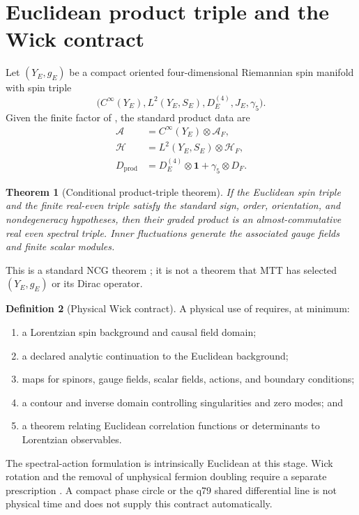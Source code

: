 \documentclass[11pt,a4paper,twoside]{article}
\theoremstyle{plain}
\newtheorem{theorem}{Theorem}[section]
\theoremstyle{definition}
\newtheorem{definition}[theorem]{Definition}
\theoremstyle{remark}
\newcommand{\AF}{\mathcal{A}_{F}}
\newcommand{\HF}{\mathcal{H}_{F}}
\newcommand{\DF}{D_{F}}
\newcommand{\id}{\mathbf{1}}
\begin{document}
\section{Euclidean product triple and the Wick contract}

Let $(Y_E,g_E)$ be a compact oriented four-dimensional Riemannian spin
manifold with spin triple
\[
 \bigl(C^\infty(Y_E),L^2(Y_E,S_E),D_E^{(4)},J_E,\gamma_5\bigr).
\]
Given the finite factor of , the standard product data are
\[
\begin{aligned}
 \mathcal{A}&=C^\infty(Y_E)\otimes\AF,\\
 \mathcal{H}&=L^2(Y_E,S_E)\otimes\HF,\\
 D_{\mathrm{prod}}
   &=D_E^{(4)}\otimes\id+\gamma_5\otimes\DF.
\end{aligned}
\]

\begin{theorem}[Conditional product-triple theorem]
\label{thm:product}
If the Euclidean spin triple and the finite real-even triple satisfy the
standard sign, order, orientation, and nondegeneracy hypotheses, then their
graded product is an almost-commutative real even spectral triple.  Inner
fluctuations generate the associated gauge fields and finite scalar modules.
\end{theorem}

This is a standard NCG theorem
\cite{Connes1994,ConnesMarcolli2007,vanSuijlekom2015}; it is not a theorem
that MTT has selected $(Y_E,g_E)$ or its Dirac operator.

\begin{definition}[Physical Wick contract]
A physical use of  requires, at minimum:
\begin{enumerate}
\item a Lorentzian spin background and causal field domain;
\item a declared analytic continuation to the Euclidean background;
\item maps for spinors, gauge fields, scalar fields, actions, and boundary
      conditions;
\item a contour and inverse domain controlling singularities and zero modes;
      and
\item a theorem relating Euclidean correlation functions or determinants to
      Lorentzian observables.
\end{enumerate}
\end{definition}

The spectral-action formulation is intrinsically Euclidean at this stage.
Wick rotation and the removal of unphysical fermion doubling require a
separate prescription \cite{DAndreaKurkovLizzi2016}.  A compact phase circle
or the q79 shared differential line is not physical time and does not supply
this contract automatically.
\end{document}
